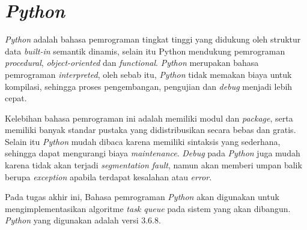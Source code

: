 	\section{\textit{Python}}
		\textit{Python} adalah bahasa pemrograman tingkat tinggi yang didukung oleh struktur data \textit{built-in} semantik dinamis, selain itu Python mendukung pemrograman \textit{procedural}, \textit{object-oriented} dan \textit{functional}. \textit{Python} merupakan bahasa pemrograman \textit{interpreted}, oleh sebab itu, \textit{Python} tidak memakan biaya untuk kompilasi, sehingga proses pengembangan, pengujian dan \textit{debug} menjadi lebih cepat.
		 
		\indent Kelebihan bahasa pemrograman ini adalah memiliki modul dan \textit{package}, serta memiliki banyak standar pustaka yang didistribusikan secara bebas dan gratis. Selain itu \textit{Python} mudah dibaca karena memiliki sintaksis yang sederhana, sehingga dapat mengurangi biaya \textit{maintenance}. \textit{Debug} pada \textit{Python} juga mudah karena tidak akan terjadi \textit{segmentation fault}, namun akan memberi umpan balik berupa \textit{exception} apabila terdapat kesalahan atau \textit{error}\cite{python}.
		
		\indent Pada tugas akhir ini, Bahasa pemrograman \textit{Python} akan digunakan untuk mengimplementasikan algoritme \textit{task queue} pada sistem yang akan dibangun. \textit{Python} yang digunakan adalah versi 3.6.8.